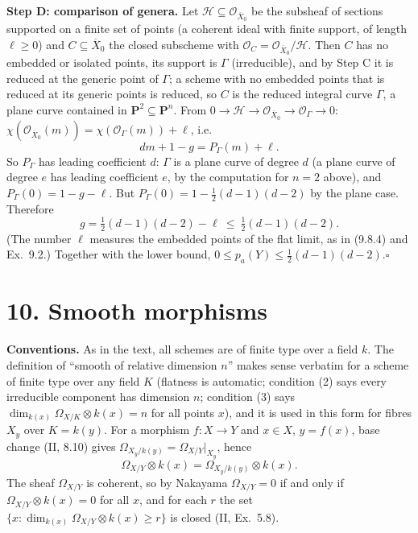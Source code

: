 \documentclass[11pt]{article}
\begin{document}
\textbf{Step D: comparison of genera.} Let $\mathcal H\subseteq\mathcal O_{\overline X_0}$ be the subsheaf of sections supported on a finite set of points (a coherent ideal with finite support, of length $\ell\ge0$) and $C\subseteq\overline X_0$ the closed subscheme with $\mathcal O_C=\mathcal O_{\overline X_0}/\mathcal H$. Then $C$ has no embedded or isolated points, its support is $\Gamma$ (irreducible), and by Step C it is reduced at the generic point of $\Gamma$; a scheme with no embedded points that is reduced at its generic points is reduced, so $C$ is the reduced integral curve $\Gamma$, a plane curve contained in $\mathbf P^2\subseteq\mathbf P^n$. From $0\to\mathcal H\to\mathcal O_{\overline X_0}\to\mathcal O_\Gamma\to0$: $\chi(\mathcal O_{\overline X_0}(m))=\chi(\mathcal O_\Gamma(m))+\ell$, i.e.
\[
dm+1-g=P_\Gamma(m)+\ell .
\]
So $P_\Gamma$ has leading coefficient $d$: $\Gamma$ is a plane curve of degree $d$ (a plane curve of degree $e$ has leading coefficient $e$, by the computation for $n=2$ above), and $P_\Gamma(0)=1-g-\ell$. But $P_\Gamma(0)=1-\tfrac12(d-1)(d-2)$ by the plane case. Therefore
\[
g=\tfrac12(d-1)(d-2)-\ell\ \le\ \tfrac12(d-1)(d-2).
\]
(The number $\ell$ measures the embedded points of the flat limit, as in (9.8.4) and Ex.~9.2.) Together with the lower bound, $0\le p_a(Y)\le\tfrac12(d-1)(d-2)$.\hfill$\square$

\section*{10. Smooth morphisms}

\textbf{Conventions.} As in the text, all schemes are of finite type over a field $k$. The definition of ``smooth of relative dimension $n$'' makes sense verbatim for a scheme of finite type over any field $K$ (flatness is automatic; condition (2) says every irreducible component has dimension $n$; condition (3) says $\dim_{k(x)}\Omega_{X/K}\otimes k(x)=n$ for all points $x$), and it is used in this form for fibres $X_y$ over $K=k(y)$. For a morphism $f:X\to Y$ and $x\in X$, $y=f(x)$, base change (II, 8.10) gives $\Omega_{X_y/k(y)}=\Omega_{X/Y}|_{X_y}$, hence
\[
\Omega_{X/Y}\otimes k(x)=\Omega_{X_y/k(y)}\otimes k(x).
\]
The sheaf $\Omega_{X/Y}$ is coherent, so by Nakayama $\Omega_{X/Y}=0$ if and only if $\Omega_{X/Y}\otimes k(x)=0$ for all $x$, and for each $r$ the set $\{x:\dim_{k(x)}\Omega_{X/Y}\otimes k(x)\ge r\}$ is closed (II, Ex.~5.8).
\end{document}
